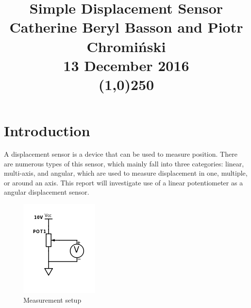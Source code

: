 \documentclass[a4,11pt]{article}
\begin{document}
\twocolumn

\title{\Huge{Simple Displacement Sensor}\\
\Large{Catherine Beryl Basson and Piotr Chromi\'nski}\\
\large{13 December 2016}\\
\line(1,0){250}}
\date{}
\maketitle
\section{Introduction} \label{intro}

A displacement sensor is a device that can be used to measure position. There are numerous types of this sensor, which mainly fall into three categories: linear, multi-axis, and angular, which are used to measure displacement in one, multiple, or around an axis. This report will investigate use of a linear potentiometer as a angular displacement sensor.

\begin{figure}[h] 
  \centering
  \includegraphics[width=0.5\columnwidth]{setup.png}
  \caption{
\label{fig:measurementsetup} %
    Measurement setup
  }
\end{figure}
\end{document}
